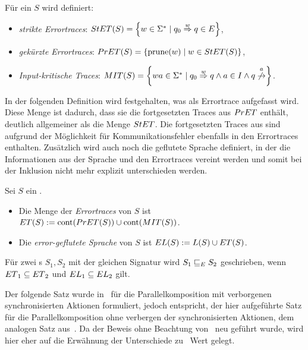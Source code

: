\pagebreak

\begin{Def}[Errortraces]
\label{DefErrortraces}
  Für ein \EIO{} $S$ wird definiert:
  \begin{itemize}
    \item \emph{strikte Errortraces}: $StET{}(S)=\left\{w\in\Sigma
      ^*\mid q_0\overset{w}{\Rightarrow}q\in E\right\}$,
    \item \emph{gekürzte Errortraces}: $PrET{}(S)=\left\{\mathrm{prune}{}(w)\mid w\in
      StET{}(S)\right\}$,
    \item \emph{Input-kritische Traces}: $\MIT{}(S)=\left\{wa\in\Sigma ^*\mid
      q_0\overset{w}{\Rightarrow}q\wedge a\in I\wedge
    q\overset{a}{\not{\hspace{-0.1cm}\rightarrow}}\right\}$.
  \end{itemize}
\end{Def}

In der folgenden Definition wird festgehalten, was als Errortrace aufgefasst
wird. Diese Menge ist dadurch, dass sie die fortgesetzten Traces aus $PrET{}$
enthält, deutlich allgemeiner als die Menge $StET{}$. Die fortgesetzten Traces
aus \MIT{} sind aufgrund der Möglichkeit für Kommunikationsfehler ebenfalls in
den Errortraces enthalten. Zusätzlich wird auch noch
die geflutete Sprache definiert, in der die Informationen aus der Sprache und den
Errortraces vereint werden und somit bei der Inklusion nicht mehr explizit
unterschieden werden.

\begin{Def}
\label{DefETEL}
  Sei $S$ ein \EIO{}.
  \begin{itemize}
    \item Die Menge der \emph{Errortraces} von $S$ ist $ET{}(S):=\mathrm{cont}{}(PrET{}(S))\cup
      \mathrm{cont}{}(MIT{}(S))$.
    \item Die \emph{error-geflutete Sprache} von $S$ ist $EL{}(S):=L(S)\cup ET{}(S)$.
  \end{itemize}
  Für zwei \EIO{}s $S_1, S_2$ mit der gleichen Signatur wird
  $S_1\sqsubseteq _E S_2$ geschrieben, wenn $ET{}_1\subseteq ET{}_2$ und
  $EL{}_1\subseteq EL{}_2$ gilt.
\end{Def}

Der folgende Satz wurde in~\cite{Vogler2014EIO} für die Parallelkomposition
mit verborgenen synchronisierten Aktionen formuliert, jedoch entspricht, der
hier aufgeführte Satz für die Parallelkomposition ohne verbergen der
synchronisierten Aktionen, dem
analogen Satz aus~\cite{Schlosser2012BA}. Da der Beweis ohne Beachtung
von~\cite{Schlosser2012BA} neu geführt wurde, wird hier eher auf die
Erwähnung der Unterschiede zu~\cite{Vogler2014EIO} Wert gelegt.


